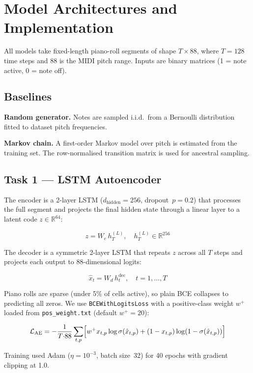 \documentclass{article} %
\begin{document}
\section{Model Architectures and Implementation}

All models take fixed-length piano-roll segments of shape $T \times 88$, where $T = 128$ time steps and 88 is the MIDI pitch range. Inputs are binary matrices (1 = note active, 0 = note off).

\subsection{Baselines}

\textbf{Random generator.} Notes are sampled i.i.d.\ from a Bernoulli distribution fitted to dataset pitch frequencies.

\textbf{Markov chain.} A first-order Markov model over pitch is estimated from the training set. The row-normalised transition matrix is used for ancestral sampling.

\subsection{Task 1 --- LSTM Autoencoder}

The encoder is a 2-layer LSTM \citep{Hochreiter1997LongSM} ($d_\text{hidden}{=}256$, dropout~$p{=}0.2$) that processes the full segment and projects the final hidden state through a linear layer to a latent code $z \in \mathbb{R}^{64}$:

\[
  z = W_e \, h_T^{(L)}, \quad h_T^{(L)} \in \mathbb{R}^{256}
\]

The decoder is a symmetric 2-layer LSTM that repeats $z$ across all $T$ steps and projects each output to 88-dimensional logits:

\[
  \hat{x}_t = W_d \, h_t^{\text{dec}}, \quad t = 1,\ldots,T
\]

Piano rolls are sparse (under 5\% of cells active), so plain BCE collapses to predicting all zeros. We use \texttt{BCEWithLogitsLoss} with a positive-class weight $w^+$ loaded from \texttt{pos\_weight.txt} (default $w^+ = 20$):

\[
  \mathcal{L}_{\text{AE}} = -\frac{1}{T{\cdot}88}\sum_{t,p}\Bigl[w^+ x_{t,p}\log\sigma(\hat{x}_{t,p}) + (1-x_{t,p})\log(1-\sigma(\hat{x}_{t,p}))\Bigr]
\]

Training used Adam \citep{Kingma2014AdamAM} ($\eta=10^{-3}$, batch size~32) for 40 epochs with gradient clipping at 1.0.
\end{document}
